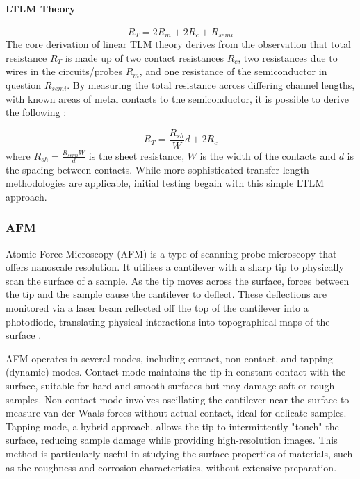 \begin{refsection}
\paragraph{LTLM Theory}
\begin{equation}
    R_{T}=2R_{m}+2R_{c}+R_{semi}
\end{equation}
The core derivation of linear TLM theory derives from the observation that total resistance $R_{T}$ is made up of two contact resistances $R_{c}$, two resistances due to wires in the circuits/probes $R_{m}$, and one resistance of the semiconductor in question $R_{semi}$. By measuring the total resistance across differing channel lengths, with known areas of metal contacts to the semiconductor, it is possible to derive the following \cite{Schroder2006-sx}:

\begin{equation}
    R_{T} = \frac{R_{sh}}{W}d+2R_{c}
\end{equation}
where $R_{sh} = \frac{R_{semi}W}{d}$ is the sheet resistance, $W$ is the width of the contacts and $d$ is the spacing between contacts. While more sophisticated transfer length methodologies are applicable, initial testing begain with this simple LTLM approach.

\subsubsection{AFM}
Atomic Force Microscopy (AFM) is a type of scanning probe microscopy that offers nanoscale resolution. It utilises a cantilever with a sharp tip to physically scan the surface of a sample. As the tip moves across the surface, forces between the tip and the sample cause the cantilever to deflect. These deflections are monitored via a laser beam reflected off the top of the cantilever into a photodiode, translating physical interactions into topographical maps of the surface \cite{Cheong2019}.

AFM operates in several modes, including contact, non-contact, and tapping (dynamic) modes. Contact mode maintains the tip in constant contact with the surface, suitable for hard and smooth surfaces but may damage soft or rough samples. Non-contact mode involves oscillating the cantilever near the surface to measure van der Waals forces without actual contact, ideal for delicate samples. Tapping mode, a hybrid approach, allows the tip to intermittently "touch" the surface, reducing sample damage while providing high-resolution images. This method is particularly useful in studying the surface properties of materials, such as the roughness and corrosion characteristics, without extensive preparation.


\end{refsection}
